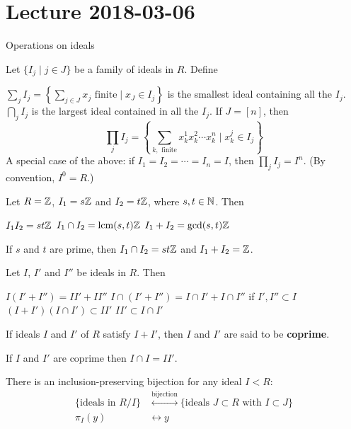 \section{Lecture 2018-03-06}

Operations on ideals

\begin{defn}
	Let $\{I_j \mid j \in J\}$ be a family of ideals in $R$.
	Define
	\begin{itm}
		\io $\sum_j I_j = \left\{ \sum_{j \in J} x_j \text{ finite} \mid x_J \in I_j \right\}$ is the smallest ideal containing all the $I_j$.
		\io $\bigcap_j I_j$ is the largest ideal contained in all the $I_j$.
		\io If $J = [n]$, then
		\[\prod_j I_j = \left\{ \sum_{k,\text{ finite}} x_k^1 x_k^2 \cdots x_k^n \mid x_k^j \in I_j\right\}\]
		\io A special case of the above: if $I_1=I_2=\cdots=I_n=I$, then $\prod_j I_j = I^n$.
		(By convention, $I^0=R$.)
	\end{itm}
\end{defn}

\begin{exam}
	Let $R=\mathbb{Z}$, $I_1 = s\mathbb{Z}$ and $I_2 = t\mathbb{Z}$, where $s,t \in \mathbb{N}$.
	Then
	\begin{itm}
		\io $I_1 I_2 = st\mathbb{Z}$
		\io $I_1 \cap I_2 = \operatorname{lcm}(s,t)\mathbb{Z}$
		\io $I_1+I_2 = \gcd(s,t)\mathbb{Z}$
	\end{itm}
	If $s$ and $t$ are prime, then $I_1 \cap I_2 = st\mathbb{Z}$ and $I_1+I_2=\mathbb{Z}$.
\end{exam}

\begin{prop}
	Let $I$, $I'$ and $I''$ be ideals in $R$.
	Then
	\begin{itm}
		\io $I(I'+I'') = II'+II''$
		\io $I \cap (I'+I'') = I \cap I' + I \cap I''$ if $I',I'' \subset I$
		\io $(I+I')(I \cap I') \subset II'$
		\io $II' \subset I \cap I'$
	\end{itm}
\end{prop}

\begin{defn}
	If ideals $I$ and $I'$ of $R$ satisfy $I+I'$, then $I$ and $I'$ are said to be \textbf{coprime}.
\end{defn}

\begin{prop}
	If $I$ and $I'$ are coprime then $I \cap I = II'$.
\end{prop}

\begin{prop}
	There is an inclusion-preserving bijection for any ideal $I<R$:
	\begin{align}
		\{\text{ideals in } R/I\} &\overset{\text{bijection}}{\longleftrightarrow} \{\text{ideals } J \subset R \text{ with } I \subset J\} \\
		\pi_I(y) &\longleftrightarrow y
	\end{align}
\end{prop}

